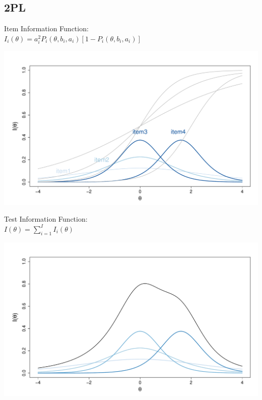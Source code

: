 \documentclass[aspectratio=149, compress]{beamer}
\begin{document}
\subsection*{2PL}


\begin{frame}
	
	\centering
	\begin{overprint}
		
		\centering
		
		\vspace*{3mm}
		
		Item Information Function:	\\
		$I_i(\theta) = a_i^2P_i(\theta, b_i, a_i)[1-P_i(\theta, b_i, a_i)]$
		
		\centering
		\includegraphics[width=.80\linewidth]{img/IIF-2pl.pdf}
		
		\vspace*{3mm}
		Test Information Function:	\\	$I(\theta) =  \sum_{i = 1}^{I} I_i(\theta)$
		
		\centering
		\includegraphics[width=.80\linewidth]{img/TIF-2pl.pdf}
	\end{overprint}
\end{frame}
\end{document}

